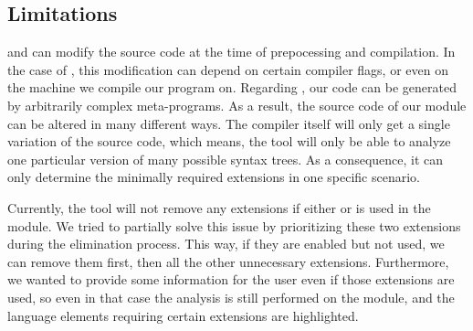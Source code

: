 \documentclass[main.tex]{subfiles}
\begin{document}
	\subsection{Limitations}
	
	 and  can modify the source code at the time of prepocessing and compilation. In the case of , this modification can depend on certain compiler flags, or even on the machine we compile our program on. Regarding , our code can be generated by arbitrarily complex meta-programs. As a result, the source code of our module can be altered in many different ways. The compiler itself will only get a single variation of the source code, which means, the tool will only be able to analyze one particular version of many possible syntax trees. As a consequence, it can only determine the minimally required extensions in one specific scenario.
	
	Currently, the tool will not remove any extensions if either  or  is used in the module. We tried to partially solve this issue by prioritizing these two extensions during the elimination process. This way, if they are enabled but not used, we can remove them first, then all the other unnecessary extensions. Furthermore, we wanted to provide some information for the user even if those extensions are used, so even in that case the analysis is still performed on the module, and the language elements requiring certain extensions are highlighted.

		
\end{document}
